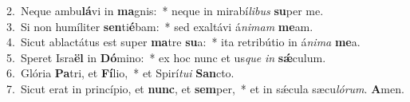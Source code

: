 {2.~}Neque ambu\textbf{lá}vi in \textbf{ma}gnis:~* neque in mirabí\textit{li}\textit{bus} \textbf{su}per me.\\
{3.~}Si non humíliter \textbf{sen}ti\textbf{é}bam:~* sed exaltávi á\textit{ni}\textit{mam} \textbf{me}am.\\
{4.~}Sicut ablactátus est super \textbf{ma}tre \textbf{su}a:~* ita retribútio in á\textit{ni}\textit{ma} \textbf{me}a.\\
{5.~}Speret Isra\textbf{ël} in \textbf{Dó}mino:~* ex hoc nunc et us\textit{que} \textit{in} \textbf{sǽ}culum.\\
{6.~}Glória \textbf{Pa}tri, et \textbf{Fí}lio,~* et Spirí\textit{tu}\textit{i} \textbf{San}cto.\\
{7.~}Sicut erat in princípio, et \textbf{nunc}, et \textbf{sem}per,~* et in sǽcula sæcu\textit{ló}\textit{rum}. \textbf{A}men.\\
